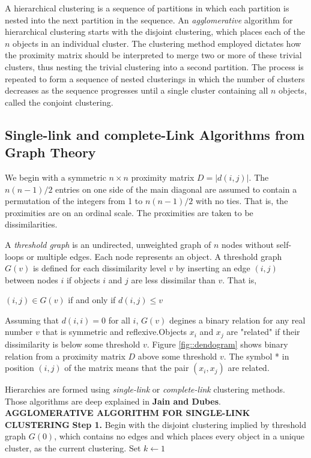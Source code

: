 A hierarchical clustering is a sequence of partitions in which each partition is nested into the next partition in the sequence. An \textit{agglomerative} algorithm for hierarchical clustering starts with the disjoint clustering, which places each of the $n$ objects in an individual cluster. The clustering method employed dictates how the proximity matrix should be interpreted to merge two or more of these trivial clusters, thus nesting the trivial clustering into a second partition. The process is repeated to form a sequence of nested clusterings in which the number of clusters decreases as the sequence progresses until a single cluster containing all $n$ objects, called the conjoint clustering.

\subsection{Single-link and complete-Link Algorithms from Graph Theory}

We begin with a symmetric $n \times n$ proximity matrix $D = |d(i, j)|$. The $n(n - 1)/2$ entries on one side of the main diagonal are assumed to contain a permutation of the integers from 1 to $n(n - 1)/2$ with no ties. That is, the proximities are on an ordinal scale. The proximities are taken to be dissimilarities. 

A \textit{threshold graph} is an undirected, unweighted graph of $n$ nodes without self-loops or multiple edges. Each node represents an object. A threshold graph $G(v)$ is defined for each dissimilarity level $v$ by inserting an edge $(i, j)$ between nodes $i$ if objects $i$ and $j$ are less dissimilar than $v$. That is,

\centerline{$(i, j) \in G(v)$ if and only if $d(i, j) \leq v$}

Assuming that $d(i, i) = 0$ for all $i$, $G(v)$ degines a binary relation for any real number $v$ that is symmetric and reflexive.Objects $x_i$ and $x_j$ are "related" if their dissimilarity is below some threshold $v$. Figure \ref{fig::dendogram} shows binary relation from a proximity matrix $D$ above some threshold $v$. The symbol * in position $(i, j)$ of the matrix means that the pair $(x_i, x_j)$ are related.

Hierarchies are formed using \textit{single-link} or \textit{complete-link} clustering methods. Those algorithms are deep explained in \textbf{Jain and Dubes}. \\

\textbf{AGGLOMERATIVE ALGORITHM FOR SINGLE-LINK CLUSTERING}
\textbf{Step 1.} Begin with the disjoint clustering implied by threshold graph $G(0)$, which contains no edges and which places every object in a unique cluster, as the current clustering. Set $k \leftarrow 1$


